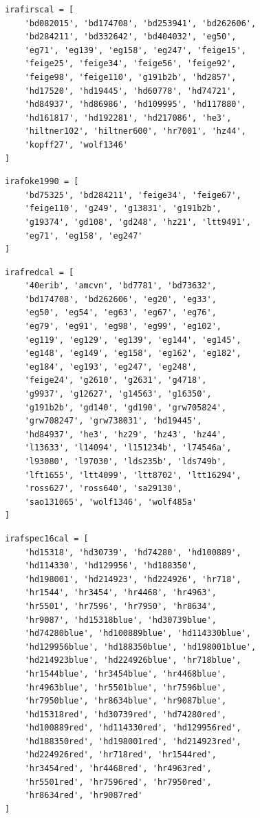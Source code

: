 \documentclass[fleqn,usenatbib]{mnras}
\begin{document}
\begin{verbatim}
irafirscal = [
    'bd082015', 'bd174708', 'bd253941', 'bd262606',
    'bd284211', 'bd332642', 'bd404032', 'eg50',
    'eg71', 'eg139', 'eg158', 'eg247', 'feige15',
    'feige25', 'feige34', 'feige56', 'feige92',
    'feige98', 'feige110', 'g191b2b', 'hd2857',
    'hd17520', 'hd19445', 'hd60778', 'hd74721',
    'hd84937', 'hd86986', 'hd109995', 'hd117880',
    'hd161817', 'hd192281', 'hd217086', 'he3',
    'hiltner102', 'hiltner600', 'hr7001', 'hz44',
    'kopff27', 'wolf1346'
]
\end{verbatim}

\begin{verbatim}
irafoke1990 = [
    'bd75325', 'bd284211', 'feige34', 'feige67',
    'feige110', 'g249', 'g13831', 'g191b2b',
    'g19374', 'gd108', 'gd248', 'hz21', 'ltt9491',
    'eg71', 'eg158', 'eg247'
]
\end{verbatim}

\begin{verbatim}
irafredcal = [
    '40erib', 'amcvn', 'bd7781', 'bd73632',
    'bd174708', 'bd262606', 'eg20', 'eg33',
    'eg50', 'eg54', 'eg63', 'eg67', 'eg76',
    'eg79', 'eg91', 'eg98', 'eg99', 'eg102',
    'eg119', 'eg129', 'eg139', 'eg144', 'eg145',
    'eg148', 'eg149', 'eg158', 'eg162', 'eg182',
    'eg184', 'eg193', 'eg247', 'eg248',
    'feige24', 'g2610', 'g2631', 'g4718',
    'g9937', 'g12627', 'g14563', 'g16350',
    'g191b2b', 'gd140', 'gd190', 'grw705824',
    'grw708247', 'grw738031', 'hd19445',
    'hd84937', 'he3', 'hz29', 'hz43', 'hz44',
    'l13633', 'l14094', 'l151234b', 'l74546a',
    'l93080', 'l97030', 'lds235b', 'lds749b',
    'lft1655', 'ltt4099', 'ltt8702', 'ltt16294',
    'ross627', 'ross640', 'sa29130',
    'sao131065', 'wolf1346', 'wolf485a'
]
\end{verbatim}

\begin{verbatim}
irafspec16cal = [
    'hd15318', 'hd30739', 'hd74280', 'hd100889',
    'hd114330', 'hd129956', 'hd188350',
    'hd198001', 'hd214923', 'hd224926', 'hr718',
    'hr1544', 'hr3454', 'hr4468', 'hr4963',
    'hr5501', 'hr7596', 'hr7950', 'hr8634',
    'hr9087', 'hd15318blue', 'hd30739blue',
    'hd74280blue', 'hd100889blue', 'hd114330blue',
    'hd129956blue', 'hd188350blue', 'hd198001blue',
    'hd214923blue', 'hd224926blue', 'hr718blue',
    'hr1544blue', 'hr3454blue', 'hr4468blue',
    'hr4963blue', 'hr5501blue', 'hr7596blue',
    'hr7950blue', 'hr8634blue', 'hr9087blue',
    'hd15318red', 'hd30739red', 'hd74280red',
    'hd100889red', 'hd114330red', 'hd129956red',
    'hd188350red', 'hd198001red', 'hd214923red',
    'hd224926red', 'hr718red', 'hr1544red',
    'hr3454red', 'hr4468red', 'hr4963red',
    'hr5501red', 'hr7596red', 'hr7950red',
    'hr8634red', 'hr9087red'
]
\end{verbatim}
\end{document}
